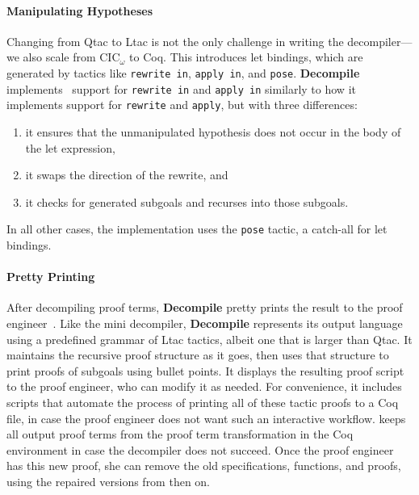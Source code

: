 \paragraph{Manipulating Hypotheses}
Changing from Qtac to Ltac is not the only challenge in writing the decompiler---we also scale from CIC$_{\omega}$ to Coq.
This introduces let bindings, which are generated by tactics like \lstinline{rewrite in}, \lstinline{apply in}, and \lstinline{pose}.
\textbf{Decompile} implements~ %
support for \lstinline{rewrite in} and \lstinline{apply in} similarly to how it implements support for
\lstinline{rewrite} and \lstinline{apply}, but with three differences:

\begin{enumerate}
\item it ensures that the unmanipulated hypothesis does not occur in the body of the let expression,
\item it swaps the direction of the rewrite, and
\item it checks for generated subgoals and recurses into those subgoals.
\end{enumerate}
In all other cases, the implementation uses the \lstinline{pose} tactic, a catch-all for let bindings.

\paragraph{Pretty Printing}
After decompiling proof terms, \textbf{Decompile} pretty prints the result to the proof engineer~.
Like the mini decompiler, \textbf{Decompile} represents its output language using a predefined grammar of Ltac tactics,
albeit one that is larger than Qtac.
It maintains the recursive proof structure as it goes, then uses that structure to print proofs of subgoals using bullet points.
It displays the resulting proof script to the proof engineer, who can modify it as needed.
For convenience, it includes scripts that automate the process of printing all of these tactic proofs to a Coq file,
in case the proof engineer does not want such an interactive workflow.
\toolname keeps all output proof terms from the proof term transformation in the Coq environment in case the decompiler does not succeed.
Once the proof engineer has this new proof, she can remove the old specifications, functions, and proofs, using the repaired
versions from then on.

